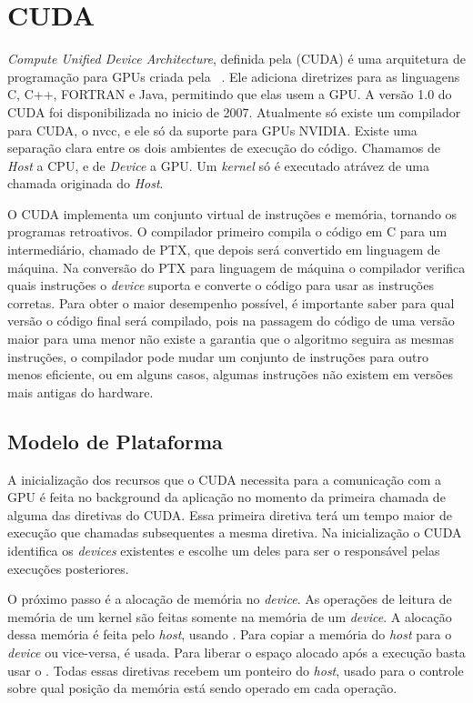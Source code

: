 \section{CUDA}
\textit{Compute Unified Device Architecture}, definida pela (CUDA) é uma arquitetura de programação para GPUs criada
pela ~\cite{nvidia2007compute}.
Ele adiciona diretrizes para as linguagens C, C++, FORTRAN e Java, permitindo que elas usem a GPU.
A versão 1.0 do CUDA foi disponibilizada no inicio de 2007. Atualmente só existe um compilador para CUDA, o nvcc,
e ele só da suporte para GPUs NVIDIA. Existe uma separação clara entre os dois
ambientes de execução do código. Chamamos de \textit{Host} a CPU, e de \textit{Device}
a GPU. Um \textit{kernel} só é executado atrávez de uma chamada originada do \textit{Host}.

O CUDA implementa um conjunto virtual de instruções e memória, tornando os programas retroativos. O compilador
primeiro compila o código em C para um intermediário, chamado de PTX, que depois será convertido em linguagem
de máquina. Na conversão do PTX para linguagem de máquina o compilador verifica quais instruções o \textit{device}
suporta e converte o código para usar as instruções corretas.
Para obter o maior desempenho possível, é importante saber para qual versão o código final será compilado,
pois na passagem do código de uma versão maior para uma menor não existe a garantia que o algoritmo seguira as mesmas instruções,
o compilador pode mudar um conjunto de instruções para outro menos eficiente, ou em alguns casos, algumas instruções não existem em
versões mais antigas do hardware.

\subsection{Modelo de Plataforma}
A inicialização dos recursos que o CUDA necessita para a comunicação com a GPU é feita no background da
aplicação no momento da primeira chamada de alguma das diretivas do CUDA. Essa primeira diretiva terá um
tempo maior de execução que chamadas subsequentes a mesma diretiva. Na inicialização o CUDA identifica
os \textit{devices} existentes e escolhe um deles para ser o responsável pelas execuções posteriores.

O próximo passo é a alocação de memória no \textit{device}. As operações de leitura de memória de um kernel são feitas somente
na memória de um \textit{device}. A alocação dessa memória é feita pelo \textit{host}, usando .
Para copiar a memória do \textit{host} para o \textit{device} ou vice-versa,
 é usada. Para liberar o espaço alocado após a execução basta usar o .
Todas essas diretivas recebem um ponteiro do \textit{host}, usado para o controle sobre qual posição da memória está sendo
operado em cada operação.

